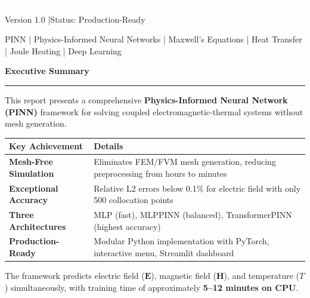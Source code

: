 \documentclass[11pt,a4paper]{article}
\begin{document}
\begin{center}
    \vspace{2cm}

    {\large\textcolor{white}{July 31, 2026}}\\[0.3cm]
    {\small\textcolor{brandlight}{Version 1.0 \quad|\quad Status: Production-Ready}}

    \vspace{1.5cm}

    {\footnotesize\textcolor{brandlight}{PINN | Physics-Informed Neural Networks | Maxwell's Equations | Heat Transfer | Joule Heating | Deep Learning}}
\end{center}

\newpage

\thispagestyle{empty}
\begin{center}
    {\LARGE\bfseries\textcolor{branddark}{Executive Summary}}
\end{center}
\vspace{0.5cm}
\textcolor{brandblue}{\rule{\textwidth}{2pt}}
\vspace{0.5cm}

This report presents a comprehensive \textbf{Physics-Informed Neural Network (PINN)} framework for solving coupled electromagnetic-thermal systems without mesh generation.

\begin{center}
\begin{tabular}{>{\bfseries}l p{10cm}}
\toprule
\textcolor{brandblue}{Key Achievement} & \textcolor{brandblue}{Details} \\
\midrule
Mesh-Free Simulation & Eliminates FEM/FVM mesh generation, reducing preprocessing from hours to minutes \\
Exceptional Accuracy & Relative L2 errors below 0.1\% for electric field with only 500 collocation points \\
Three Architectures & MLP (fast), MLPPINN (balanced), TransformerPINN (highest accuracy) \\
Production-Ready & Modular Python implementation with PyTorch, interactive menu, Streamlit dashboard \\
\bottomrule
\end{tabular}
\end{center}

The framework predicts electric field ($\mathbf{E}$), magnetic field ($\mathbf{H}$), and temperature ($T$) simultaneously, with training time of approximately \textbf{5--12 minutes on CPU}.
\end{document}
